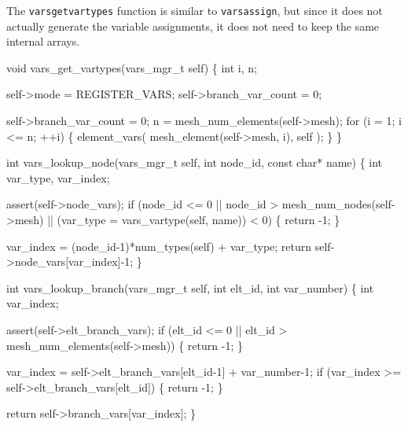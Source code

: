 \nwendcode{}\nwdocspar

The {\tt{}vars{}get{}vartypes} function is similar to {\tt{}vars{}assign},
but since it does not actually generate the variable assignments,
it does not need to keep the same internal arrays.

\nwenddocs{}\plusendmoddef
void vars_get_vartypes(vars_mgr_t self)
\{
    int i, n;

    self->mode = REGISTER_VARS;
    self->branch_var_count = 0;

    self->branch_var_count = 0;
    n = mesh_num_elements(self->mesh);
    for (i = 1; i <= n; ++i) \{
        element_vars( mesh_element(self->mesh, i), self );
    \}
\}

\nwendcode{}\nwdocspar

\nwenddocs{}\plusendmoddef
int vars_lookup_node(vars_mgr_t self, int node_id, const char* name)
\{
    int var_type, var_index;

    assert(self->node_vars);
    if (node_id <= 0 || node_id > mesh_num_nodes(self->mesh) ||
        (var_type = vars_vartype(self, name)) < 0) \{
        return -1;
    \}

    var_index = (node_id-1)*num_types(self) + var_type;
    return self->node_vars[var_index]-1;
\}

\nwendcode{}\nwdocspar

\nwenddocs{}\plusendmoddef
int vars_lookup_branch(vars_mgr_t self, int elt_id, int var_number)
\{
    int var_index;

    assert(self->elt_branch_vars);
    if (elt_id <= 0 || elt_id > mesh_num_elements(self->mesh)) \{
        return -1;
    \}   

    var_index = self->elt_branch_vars[elt_id-1] + var_number-1;
    if (var_index >= self->elt_branch_vars[elt_id]) \{
        return -1;
    \}

    return self->branch_vars[var_index];
\}

\nwendcode{}\nwdocspar

